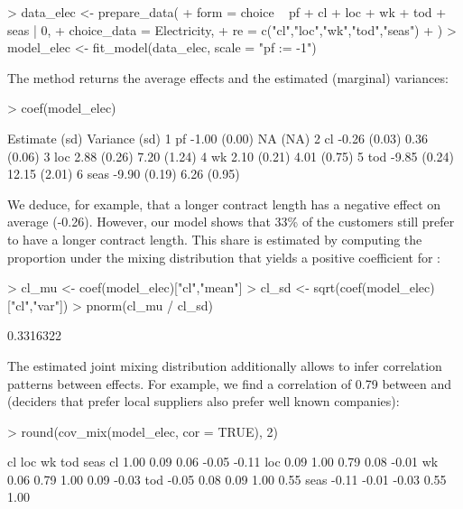 \documentclass[article,shortnames]{jss}
\newcommand{\fct}[1]{\code{#1()}}
\begin{document}
\begin{Schunk}
\begin{Sinput}
> data_elec <- prepare_data(
+    form = choice ~ pf + cl + loc + wk + tod + seas | 0,
+    choice_data = Electricity,
+    re = c("cl","loc","wk","tod","seas")
+  )
> model_elec <- fit_model(data_elec, scale = "pf := -1")
\end{Sinput}
\end{Schunk}

The \fct{coef} method returns the average effects and the estimated (marginal) variances:

\begin{Schunk}
\begin{Sinput}
> coef(model_elec)
\end{Sinput}
\begin{Soutput}
        Estimate   (sd) Variance   (sd)
1   pf     -1.00 (0.00)       NA   (NA)
2   cl     -0.26 (0.03)     0.36 (0.06)
3  loc      2.88 (0.26)     7.20 (1.24)
4   wk      2.10 (0.21)     4.01 (0.75)
5  tod     -9.85 (0.24)    12.15 (2.01)
6 seas     -9.90 (0.19)     6.26 (0.95)
\end{Soutput}
\end{Schunk}

We deduce, for example, that a longer contract length has a negative effect on average (-0.26). However, our model shows that 33\% of the customers still prefer to have a longer contract length. This share is estimated by computing the proportion under the mixing distribution that yields a positive coefficient for :

\begin{Schunk}
\begin{Sinput}
> cl_mu <- coef(model_elec)["cl","mean"]
> cl_sd <- sqrt(coef(model_elec)["cl","var"])
> pnorm(cl_mu / cl_sd)
\end{Sinput}
\begin{Soutput}
[1] 0.3316322
\end{Soutput}
\end{Schunk}

The estimated joint mixing distribution additionally allows to infer correlation patterns between effects. For example, we find a correlation of 0.79 between  and  (deciders that prefer local suppliers also prefer well known companies):

\begin{Schunk}
\begin{Sinput}
> round(cov_mix(model_elec, cor = TRUE), 2)
\end{Sinput}
\begin{Soutput}
        cl   loc    wk   tod  seas
cl    1.00  0.09  0.06 -0.05 -0.11
loc   0.09  1.00  0.79  0.08 -0.01
wk    0.06  0.79  1.00  0.09 -0.03
tod  -0.05  0.08  0.09  1.00  0.55
seas -0.11 -0.01 -0.03  0.55  1.00
\end{Soutput}
\end{Schunk}
\end{document}
